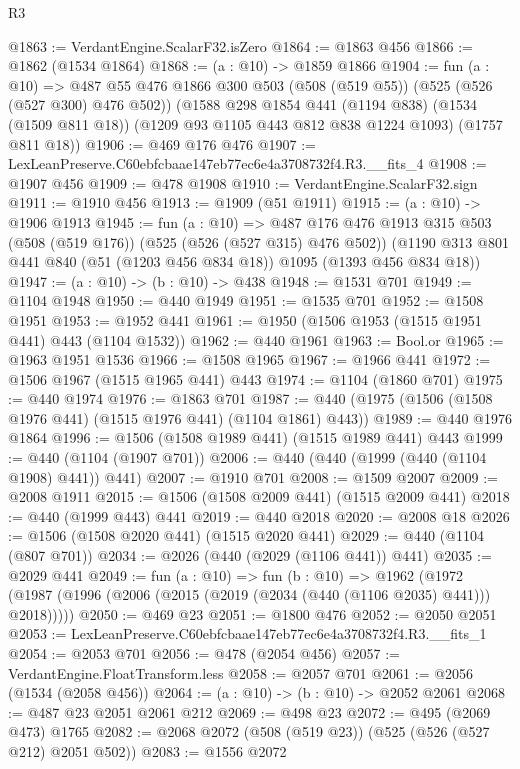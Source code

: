 \begin{lexlean}{R3}
\begin{coremodule}
@1863 := VerdantEngine.ScalarF32.isZero
@1864 := @1863 @456
@1866 := @1862 (@1534 @1864)
@1868 := (a : @10) -> @1859 @1866
@1904 := fun (a : @10) =>
  @487
    @55
    @476
    @1866
    @300
    @503
    (@508 (@519 @55))
    (@525 (@526 (@527 @300) @476 @502))
    (@1588
      @298
      @1854
      @441
      (@1194 @838)
      (@1534 (@1509 @811 @18))
      (@1209 @93 @1105 @443 @812 @838 @1224 @1093)
      (@1757 @811 @18))
@1906 := @469 @176 @476
@1907 := LexLeanPreserve.C60ebfcbaae147eb77ec6e4a3708732f4.R3.__fits_4
@1908 := @1907 @456
@1909 := @478 @1908
@1910 := VerdantEngine.ScalarF32.sign
@1911 := @1910 @456
@1913 := @1909 (@51 @1911)
@1915 := (a : @10) -> @1906 @1913
@1945 := fun (a : @10) =>
  @487
    @176
    @476
    @1913
    @315
    @503
    (@508 (@519 @176))
    (@525 (@526 (@527 @315) @476 @502))
    (@1190 @313 @801 @441 @840 (@51 (@1203 @456 @834 @18)) @1095 (@1393 @456 @834 @18))
@1947 := (a : @10) -> (b : @10) -> @438
@1948 := @1531 @701
@1949 := @1104 @1948
@1950 := @440 @1949
@1951 := @1535 @701
@1952 := @1508 @1951
@1953 := @1952 @441
@1961 := @1950 (@1506 @1953 (@1515 @1951 @441) @443 (@1104 @1532))
@1962 := @440 @1961
@1963 := Bool.or
@1965 := @1963 @1951 @1536
@1966 := @1508 @1965
@1967 := @1966 @441
@1972 := @1506 @1967 (@1515 @1965 @441) @443
@1974 := @1104 (@1860 @701)
@1975 := @440 @1974
@1976 := @1863 @701
@1987 := @440 (@1975 (@1506 (@1508 @1976 @441) (@1515 @1976 @441) (@1104 @1861) @443))
@1989 := @440 @1976 @1864
@1996 := @1506 (@1508 @1989 @441) (@1515 @1989 @441) @443
@1999 := @440 (@1104 (@1907 @701))
@2006 := @440 (@440 (@1999 (@440 (@1104 @1908) @441)) @441)
@2007 := @1910 @701
@2008 := @1509 @2007
@2009 := @2008 @1911
@2015 := @1506 (@1508 @2009 @441) (@1515 @2009 @441)
@2018 := @440 (@1999 @443) @441
@2019 := @440 @2018
@2020 := @2008 @18
@2026 := @1506 (@1508 @2020 @441) (@1515 @2020 @441)
@2029 := @440 (@1104 (@807 @701))
@2034 := @2026 (@440 (@2029 (@1106 @441)) @441)
@2035 := @2029 @441
@2049 := fun (a : @10) =>
  fun (b : @10) =>
  @1962 (@1972 (@1987 (@1996 (@2006 (@2015 (@2019 (@2034 (@440 (@1106 @2035) @441))) @2018)))))
@2050 := @469 @23
@2051 := @1800 @476
@2052 := @2050 @2051
@2053 := LexLeanPreserve.C60ebfcbaae147eb77ec6e4a3708732f4.R3.__fits_1
@2054 := @2053 @701
@2056 := @478 (@2054 @456)
@2057 := VerdantEngine.FloatTransform.less
@2058 := @2057 @701
@2061 := @2056 (@1534 (@2058 @456))
@2064 := (a : @10) -> (b : @10) -> @2052 @2061
@2068 := @487 @23 @2051 @2061 @212
@2069 := @498 @23
@2072 := @495 (@2069 @473) @1765
@2082 := @2068 @2072 (@508 (@519 @23)) (@525 (@526 (@527 @212) @2051 @502))
@2083 := @1556 @2072

\end{coremodule}
\end{lexlean}
